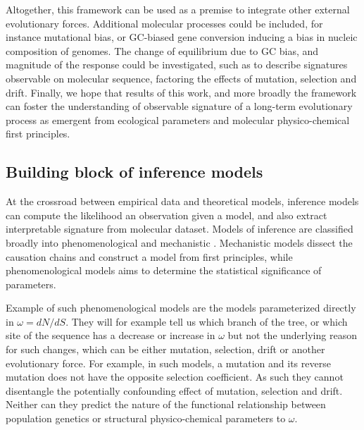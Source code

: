 Altogether, this framework can be used as a premise to integrate other external evolutionary forces.  %
Additional molecular processes could be included, for instance mutational bias, or GC-biased gene conversion inducing a bias in nucleic composition of genomes. 
The change of equilibrium due to GC bias, and magnitude of the response could be investigated, such as to describe signatures observable on molecular sequence, factoring the effects of mutation, selection and drift.
Finally, we hope that results of this work, and more broadly the framework can foster the understanding of observable signature of a long-term evolutionary process as emergent from ecological parameters and molecular physico-chemical first principles.

\subsection{Building block of inference models}

At the crossroad between empirical data and theoretical models, inference models can compute the likelihood an observation given a model, and also extract interpretable signature from molecular dataset.
Models of inference are classified broadly into phenomenological and mechanistic \citep{Rodrigue2010a}.
Mechanistic models dissect the causation chains and construct a model from first principles, while phenomenological models aims to determine the statistical significance of parameters.

Example of such phenomenological models are the models parameterized directly in $\omega = dN/dS$.
They will for example tell us which branch of the tree, or which site of the sequence has a decrease or increase in $\omega$ but not the underlying reason for such changes, which can be either mutation, selection, drift or another evolutionary force.
For example, in such models, a mutation and its reverse mutation does not have the opposite selection coefficient.
As such they cannot disentangle the potentially confounding effect of mutation, selection and drift.
Neither can they predict the nature of the functional relationship between population genetics or structural physico-chemical parameters to $\omega$.

